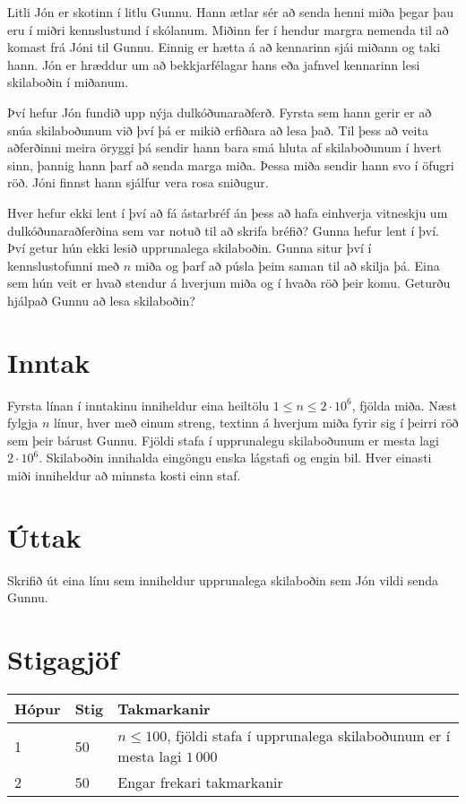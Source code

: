 
Litli Jón er skotinn í litlu Gunnu. Hann ætlar sér að senda henni miða
þegar þau eru í miðri kennslustund í skólanum. Miðinn fer í hendur
margra nemenda til að komast frá Jóni til Gunnu. Einnig er hætta á að
kennarinn sjái miðann og taki hann. Jón er hræddur um að bekkjarfélagar
hans eða jafnvel kennarinn lesi skilaboðin í miðanum.

Því hefur Jón fundið upp nýja dulkóðunaraðferð. Fyrsta sem hann gerir
er að snúa skilaboðunum við því þá er mikið erfiðara að lesa það.
Til þess að veita aðferðinni meira öryggi þá sendir hann bara smá hluta
af skilaboðunum í hvert sinn, þannig hann þarf að senda marga miða.
Þessa miða sendir hann svo í öfugri röð. Jóni finnst hann sjálfur vera rosa
sniðugur.

Hver hefur ekki lent í því að fá ástarbréf án þess að hafa einhverja
vitneskju um dulkóðunaraðferðina sem var notuð til að skrifa bréfið?
Gunna hefur lent í því. Því getur hún ekki lesið upprunalega skilaboðin.
Gunna situr því í kennslustofunni með $n$ miða og þarf að púsla þeim 
saman til að skilja þá. Eina sem hún veit er hvað stendur á hverjum miða
og í hvaða röð þeir komu. Geturðu hjálpað Gunnu að lesa skilaboðin?

\section*{Inntak}
Fyrsta línan í inntakinu inniheldur eina heiltölu $1 \leq n \leq 2 \cdot 10^6$,
fjölda miða.
Næst fylgja $n$ línur, hver með einum streng, textinn á hverjum miða 
fyrir sig í þeirri röð sem þeir bárust Gunnu.
Fjöldi stafa í upprunalegu skilaboðunum er mesta lagi $2 \cdot 10^6$.
Skilaboðin innihalda eingöngu enska lágstafi og engin bil.
Hver einasti miði inniheldur að minnsta kosti einn staf.

\section*{Úttak}
Skrifið út eina línu sem inniheldur upprunalega skilaboðin sem Jón vildi
senda Gunnu.

\section*{Stigagjöf}
\begin{tabular}{|l|l|l|}
\hline
Hópur & Stig & Takmarkanir \\ \hline
1     & 50   & $n \leq 100$, fjöldi stafa í upprunalega skilaboðunum er í mesta lagi $1\,000$ \\ \hline
2     & 50   & Engar frekari takmarkanir\\ \hline
\end{tabular}


